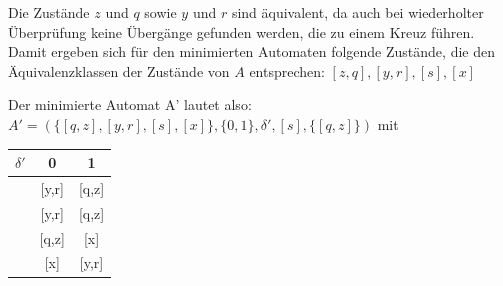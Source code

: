 	Die Zustände $z$ und $q$ sowie $y$ und $r$ sind äquivalent, da auch bei wiederholter Überprüfung keine Übergänge gefunden werden, die zu einem Kreuz führen. Damit ergeben sich für den minimierten Automaten folgende Zustände, die den Äquivalenzklassen der Zustände von $A$ entsprechen: $[z,q],[y,r],[s],[x]$
	
	Der minimierte Automat A' lautet also: \\
	$A' = (\{[q,z],[y,r],[s],[x]\},\{0,1\},\delta',[s],\{[q,z]\})$ mit

	\begin{tabular}{c|c|c}
		$\delta'$ & 0 & 1 \\
		\hline
		[s]       & [y,r]      & [q,z] 	\\
		\hline
		[x]       & [y,r]      & [q,z]	\\
		\hline
		[y,r]     & [q,z]      & [x]	\\
		\hline
		[q,z]     & [x]        & [y,r]	\\
	\end{tabular}


\newpage
